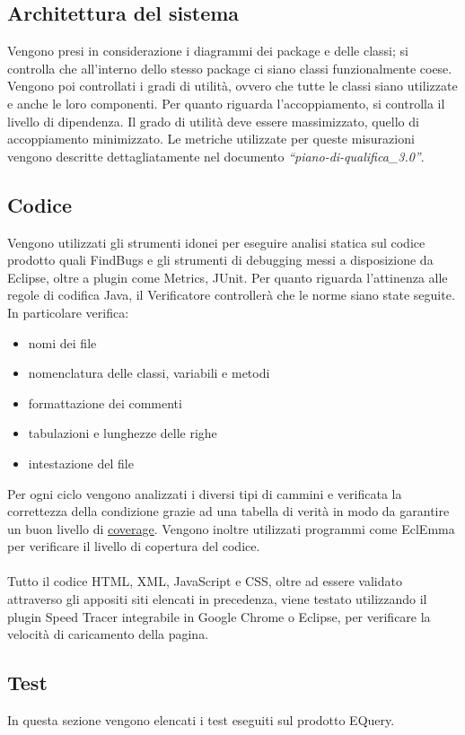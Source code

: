 \documentclass[a4paper,11pt]{article}
\begin{document}
\subsection{Architettura del sistema}
Vengono presi in considerazione i diagrammi dei package e delle classi; si controlla che all'interno dello stesso package ci siano classi funzionalmente coese. Vengono poi controllati i gradi di utilit\`a, ovvero che tutte le classi siano utilizzate e anche le loro componenti. Per quanto riguarda l'accoppiamento, si controlla il livello di dipendenza.  Il grado di utilit\`a deve essere massimizzato, quello di accoppiamento minimizzato. Le metriche utilizzate per queste misurazioni vengono descritte dettagliatamente nel documento \textit{``piano-di-qualifica\_3.0''}.
  
\subsection{Codice}
Vengono utilizzati gli strumenti idonei per eseguire analisi statica sul codice prodotto quali FindBugs e gli strumenti di debugging messi a disposizione da Eclipse, oltre a plugin come Metrics, JUnit.
Per quanto riguarda l'attinenza alle regole di codifica Java, il Verificatore controller\`a che le norme siano state seguite.\\
In particolare verifica:
\begin{itemize}
\item nomi dei file
\item nomenclatura delle classi, variabili e metodi
\item formattazione dei commenti
\item tabulazioni e lunghezze delle righe
\item intestazione del file
\end{itemize}
Per ogni ciclo vengono analizzati i diversi tipi di cammini e verificata la correttezza della condizione grazie ad una tabella di verit\`a in modo da garantire un buon livello di \underline{coverage}.
Vengono inoltre utilizzati programmi come EclEmma per verificare il livello di copertura del codice.\\
\\
Tutto il codice HTML, XML, JavaScript e CSS, oltre ad essere validato attraverso gli appositi siti elencati in precedenza, viene testato utilizzando il plugin Speed Tracer integrabile in Google Chrome o Eclipse, per verificare la velocit\`a di caricamento della pagina.

\subsection{Test}
In questa sezione vengono elencati i test eseguiti sul prodotto EQuery.
\end{document}
